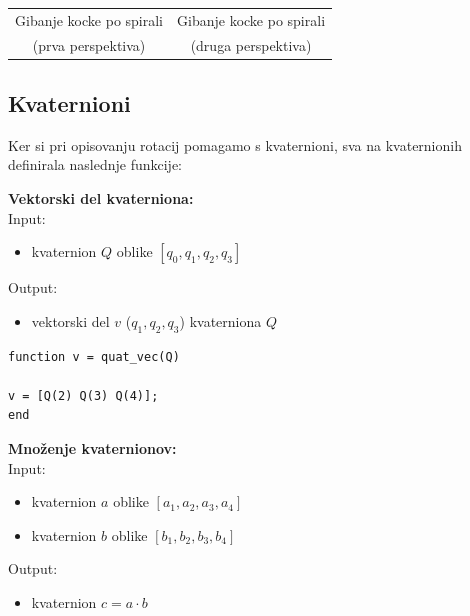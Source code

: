 \documentclass[12pt,a4paper,twoside]{article}
\theoremstyle{definition} %
\theoremstyle{plain} %
\numberwithin{equation}{section}  %
\begin{document}
\begin{center}
\begin{tabular}{c c}
\\
Gibanje kocke po spirali & Gibanje kocke po spirali \\
(prva perspektiva) & (druga perspektiva) \\
\end{tabular}
\end{center}

\newpage
\subsection{Kvaternioni}
Ker si pri opisovanju rotacij pomagamo s kvaternioni, sva na kvaternionih definirala naslednje funkcije:

%

\vspace{1cm}
\textbf{Vektorski del kvaterniona:}\\
Input:
\begin{itemize}
\item kvaternion $Q$ oblike $[q_0,q_1,q_2,q_3]$
\end{itemize}
Output:
\begin{itemize}
\item vektorski del $v$ ($q_1,q_2,q_3$) kvaterniona $Q$
\end{itemize}

\begin{lstlisting}[caption = {quat\_vec}]
function v = quat_vec(Q)

v = [Q(2) Q(3) Q(4)];
end
\end{lstlisting}


\vspace{1cm}
\textbf{Množenje kvaternionov:}\\
Input:
\begin{itemize}
\item kvaternion $a$ oblike $[a_1,a_2,a_3,a_4]$
\item kvaternion $b$ oblike $[b_1,b_2,b_3,b_4]$
\end{itemize}
Output:
\begin{itemize}
\item kvaternion $c = a \cdot b$
\end{itemize}
\end{document}
